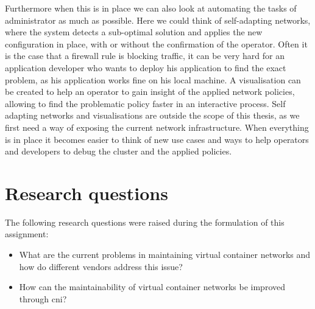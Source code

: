 Furthermore when this is in place we can also look at automating the tasks of administrator as much as possible. Here we could think of self-adapting networks, where the system detects a sub-optimal solution and applies the new configuration in place, with or without the confirmation of the operator. Often it is the case that a firewall rule is blocking traffic, it can be very hard for an application developer who wants to deploy his application to find the exact problem, as his application works fine on his local machine. A visualisation can be created to help an operator to gain insight of the applied network policies, allowing to find the problematic policy faster in an interactive process. Self adapting networks and visualisations are outside the scope of this thesis, as we first need a way of exposing the current network infrastructure. When everything is in place it becomes easier to think of new use cases and ways to help operators and developers to debug the cluster and the applied policies.


\section{Research questions}
The following research questions were raised during the formulation of this assignment:
\begin{itemize}
    \item What are the current problems in maintaining virtual container networks and how do different vendors address this issue?
    \item How can the maintainability of virtual container networks be improved through \gls{cni}?   
\end{itemize}

